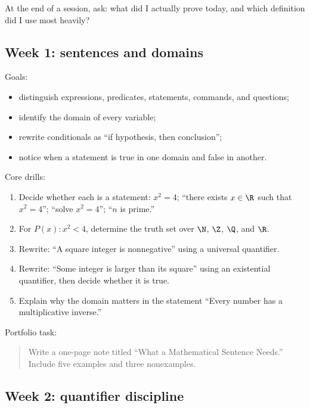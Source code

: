 \begin{walkbox}
At the end of a session, ask: what did I actually prove today, and which definition did I use most heavily?
\end{walkbox}

\subsection{Week 1: sentences and domains}

Goals:

\begin{itemize}
\item distinguish expressions, predicates, statements, commands, and questions;
\item identify the domain of every variable;
\item rewrite conditionals as ``if hypothesis, then conclusion'';
\item notice when a statement is true in one domain and false in another.
\end{itemize}

Core drills:

\begin{enumerate}
\item Decide whether each is a statement: $x^2=4$; ``there exists $x\in\R$ such that $x^2=4$''; ``solve $x^2=4$''; ``$n$ is prime.''
\item For $P(x):x^2<4$, determine the truth set over $\N$, $\Z$, $\Q$, and $\R$.
\item Rewrite: ``A square integer is nonnegative'' using a universal quantifier.
\item Rewrite: ``Some integer is larger than its square'' using an existential quantifier, then decide whether it is true.
\item Explain why the domain matters in the statement ``Every number has a multiplicative inverse.''
\end{enumerate}

Portfolio task:

\begin{quote}
Write a one-page note titled ``What a Mathematical Sentence Needs.'' Include five examples and three nonexamples.
\end{quote}

\subsection{Week 2: quantifier discipline}

